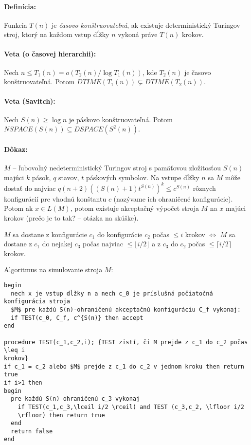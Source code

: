 \documentclass{article}
\begin{document}
\paragraph{Definícia:} Funkcia $T(n)$ je \emph{časovo konštruovateľná}, ak
existuje deterministický Turingov stroj, ktorý na každom vstup dĺžky $n$ vykoná
práve $T(n)$ krokov.

\paragraph{Veta (o časovej hierarchii):} Nech  $n \leq T_1(n) = o(T_2(n)/\log
T_1(n))$, kde $T_2(n)$ je časovo konštruovateľná. Potom $DTIME(T_1(n))
\subsetneq DTIME (T_2(n))$.

\paragraph{Veta (Savitch):} Nech $S(n) \geq \log n$ je páskovo konštruovateľná.
Potom $NSPACE(S(n)) \subseteq DSPACE(S^2(n))$.

\paragraph{Dôkaz:} $M$ -- ľubovoľný nedeterministický Turingov stroj s pamäťovou
zložitosťou $S(n)$ majúci $k$ pások, $q$ stavov, $t$ páskových symbolov. Na
vstupe dĺžky $n$ sa $M$ môže dostať do najviac $q(n+2)\left(
(S(n)+1)t^{S(n)}\right)^k \leq c^{S(n)}$ rôznych konfigurácií pre vhodnú
konštantu $c$ (nazývame ich ohraničené konfigurácie). Potom ak $x \in L(M)$,
potom existuje akceptačný výpočet stroja $M$ na $x$ majúci %
krokov (prečo je to tak? -- otázka na skúške).

\par $M$ sa dostane z konfigurácie $c_1$ do konfigurácie $c_2$ počas
$\leq i$ krokov $\iff$ $M$ sa dostane z $c_1$ do nejakej $c_3$ počas najviac $\leq
\lfloor i/2 \rfloor$ a z $c_3$ do $c_2$ počas $\leq \lceil i/2
\rceil$ krokov.

\par Algoritmus na simulovanie stroja $M$:
\begin{verbatim}
begin
  nech x je vstup dĺžky n a nech c_0 je príslušná počiatočná konfigurácia stroja
  $M$ pre každú S(n)-ohraničenú akceptačnú konfiguráciu C_f vykonaj:
  if TEST(c_0, C_f, c^{S(n)} then accept
end

procedure TEST(c_1,c_2,i); {TEST zistí, či M prejde z c_1 do c_2 počas \leq i
krokov}
if c_1 = c_2 alebo $M$ prejde z c_1 do c_2 v jednom kroku then return true
if i>1 then
begin
  pre každú S(n)-ohraničenú c_3 vykonaj
    if TEST(c_1,c_3,\lceil i/2 \rceil) and TEST (c_3,c_2, \lfloor i/2
    \rfloor) then return true
  end
  return false
end
\end{verbatim}
\end{document}
